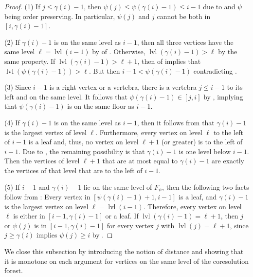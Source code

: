 \documentclass[a4paper]{amsart}
\theoremstyle{definition}
\theoremstyle{remark}
\numberwithin{equation}{theorem}
\newcommand{\level}{\operatorname{lvl}}
\newcommand{\psiforest}{F_\psi}
\begin{document}
\begin{proof}
    (1) If $j\leq\gamma(i)-1$, then $ \psi(j)\leq\psi(\gamma(i)-1)\leq i-1 $ due to  and $ \psi $ being order preserving.
    In particular, $\psi(j)$ and $j$ cannot be both in $[i, \gamma(i)-1]$.

    (2) If $ \gamma(i)-1 $ is on the same level as $ i-1 $, then all three vertices have the same level $ \ell = \level(i-1) $ by  of . Otherwise, $ \level( \gamma(i)-1 ) > \ell $ by the same property. If $ \level ( \gamma(i)-1 ) > \ell+1 $, then  of  implies that $ \level ( \psi( \gamma(i)-1 ) ) > \ell $. But then $ i-1 < \psi( \gamma(i)-1 ) $ contradicting .

    (3) Since $ i-1 $ is a right vertex or a vertebra, there is a vertebra $ j \leq i-1 $ to its left and on the same level. It follows that $ \psi ( \gamma(i)-1 ) \in [j,i] $ by , implying that $ \psi ( \gamma(i)-1 ) $ is on the same floor as $ i-1 $.


    (4) If $ \gamma(i)-1 $ is on the same level as $ i-1 $, then it follows from  that $ \gamma(i)-1 $ is the largest vertex of level $ \ell $. Furthermore, every vertex on level $ \ell $ to the left of $ i-1 $ is a leaf and, thus, no vertex on level $ \ell+1 $ (or greater) is to the left of $ i-1 $.
    Due to , the remaining possibility is that $ \gamma(i)-1 $ is one level below $ i-1 $. Then the vertices of level $ \ell+1 $ that are at most equal to $ \gamma(i)-1 $ are exactly the vertices of that level that are to the left of $ i-1 $.


    (5) If $i - 1$ and $\gamma(i) - 1$ lie on the same level of $\psiforest$, then the following two facts follow from :
    Every vertex in $[ \psi(\gamma(i)-1)+1, i-1 ]$ is a leaf, and $\gamma(i)-1$ is the largest vertex on level $\ell = \level (i-1)$. Therefore, every vertex on level $\ell$ is either in $[ i-1,\gamma(i)-1 ]$ or a leaf.
    If $ \level(\gamma(i)-1) = \ell+1 $, then $ j $ or $\psi(j) $ is in $ [ i-1, \gamma(i)-1 ] $ for every vertex $ j $ with $ \level(j) = \ell+1 $, since $ j \geq \gamma(i) $ implies $ \psi(j) \geq i $ by .
\end{proof}

We close this subsection by introducing the notion of distance and showing that it is monotone on each argument for vertices on the same level of the coresolution forest.
\end{document}
